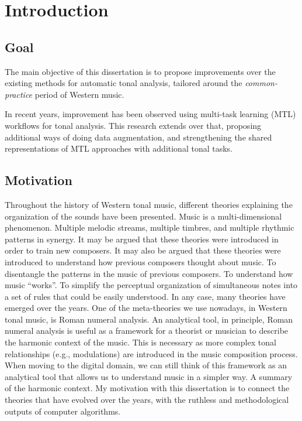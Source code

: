 \chapter{Introduction}
\label{chap:chap1}

    

\section{Goal}

The main objective of this dissertation is to propose improvements over the existing methods for automatic tonal analysis, tailored around the \emph{common-practice} period of Western music. 

In recent years, improvement has been observed using multi-task learning (MTL) workflows for tonal analysis.
This research extends over that, proposing additional ways of doing data augmentation, and strengthening the shared representations of MTL approaches with additional tonal tasks.

\section{Motivation}

Throughout the history of Western tonal music, different theories explaining the organization of the sounds have been presented.
Music is a multi-dimensional phenomenon.
Multiple melodic streams, multiple timbres, and multiple rhythmic patterns in synergy.
It may be argued that these theories were introduced in order to train new composers.
It may also be argued that these theories were introduced to understand how previous composers thought about music.
To disentangle the patterns in the music of previous composers.
To understand how music ``works''.
To simplify the perceptual organization of simultaneous notes into a set of rules that could be easily understood.
In any case, many theories have emerged over the years.
One of the meta-theories we use nowadays, in Western tonal music, is Roman numeral analysis.
An analytical tool, in principle, Roman numeral analysis is useful as a framework for a theorist or musician to describe the harmonic context of the music.
This is necessary as more complex tonal relationships (e.g., modulations) are introduced in the music composition process.
When moving to the digital domain, we can still think of this framework as an analytical tool that allows us to understand music in a simpler way.
A summary of the harmonic context.
My motivation with this dissertation is to connect the theories that have evolved over the years, with the ruthless and methodological outputs of computer algorithms.


